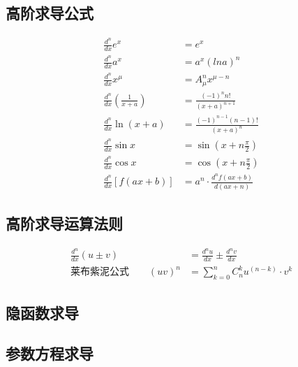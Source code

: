 \subsection{高阶求导公式}
\begin{align}
  \frac{d^n}{dx}e^x&=e^x\\
  \frac{d^n}{dx}a^x&=a^x\left(ln a\right)^n\\
  \frac{d^n}{dx}x^\mu&=A_\mu^nx^{\mu-n}\\
  \frac{d^n}{dx}\left(\frac{1}{x+a}\right)&=\frac{(-1)^nn!}{(x+a)^{n+1}}\\
  \frac{d^n}{dx}\ln(x+a)&=\frac{(-1)^{n-1}(n-1)!}{(x+a)^n}\\
  \frac{d^n}{dx}\sin x&=\sin(x+n\frac{\pi}{2})\\
  \frac{d^n}{dx}\cos x&=\cos(x+n\frac{\pi}{2})\\
  \frac{d^n}{dx}\left[f(ax+b)\right]&=a^n\cdot\frac{d^nf(ax+b)}{d(ax+n)}
\end{align}
\subsection{高阶求导运算法则}
\begin{align}
  \frac{d^n}{dx}(u\pm v)&=\frac{d^nu}{dx}\pm\frac{d^nv}{dx}\\
  \mbox{莱布紫泥公式}\qquad(uv)^{n}&=\sum_{k=0}^{n}C_{n}^{k}u^{(n-k)}\cdot v^k
\end{align}
\subsection{隐函数求导}
\subsection{参数方程求导}
